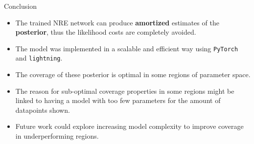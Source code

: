 \documentclass{beamer}
\begin{document}
\begin{frame}[fragile]{Conclusion}
    \begin{itemize}
        \item The trained NRE network can produce \textbf{amortized} estimates of the \textbf{posterior}, thus the likelihood costs are completely avoided.
        \item The model was implemented in a scalable and efficient way using \verb|PyTorch| and \verb|lightning|.
        \item The coverage of these posterior is optimal in some regions of parameter space.
        \item The reason for sub-optimal coverage properties in some regions might be linked to having a model with too few parameters for the amount of datapoints shown. 
        \item Future work could explore increasing model complexity to improve coverage in underperforming regions.
    \end{itemize}
\end{frame}
\end{document}
